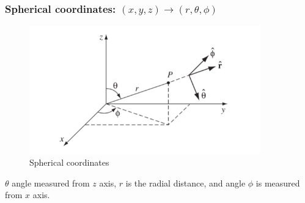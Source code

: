 \documentclass[12pt,a4paper,twoside]{article}
\numberwithin{equation}{section}
\begin{document}
	\subsubsection{Spherical coordinates: \((x,y,z)\rightarrow(r,\theta,\phi)\)}
	
	\begin{figure}[ht]
		\centering
		\includegraphics[width=10cm]{250-Revision/spherical.png}
		\caption{Spherical coordinates}
		\label{fig:spherical}
	\end{figure}
	$\theta$ angle measured from $z$ axis, $r$ is the radial distance, and angle $\phi$ is measured from $x$ axis.\\
	
\end{document}
